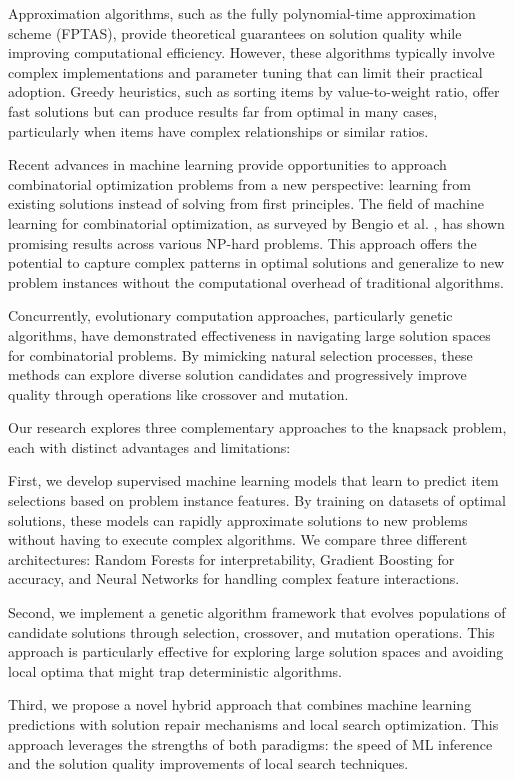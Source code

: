 \documentclass[conference, a4paper]{IEEEtran}
\begin{document}
Approximation algorithms, such as the fully polynomial-time approximation scheme (FPTAS), provide theoretical guarantees on solution quality while improving computational efficiency. However, these algorithms typically involve complex implementations and parameter tuning that can limit their practical adoption. Greedy heuristics, such as sorting items by value-to-weight ratio, offer fast solutions but can produce results far from optimal in many cases, particularly when items have complex relationships or similar ratios.

Recent advances in machine learning provide opportunities to approach combinatorial optimization problems from a new perspective: learning from existing solutions instead of solving from first principles. The field of machine learning for combinatorial optimization, as surveyed by Bengio et al. \cite{bengio2021machine}, has shown promising results across various NP-hard problems. This approach offers the potential to capture complex patterns in optimal solutions and generalize to new problem instances without the computational overhead of traditional algorithms.

Concurrently, evolutionary computation approaches, particularly genetic algorithms, have demonstrated effectiveness in navigating large solution spaces for combinatorial problems. By mimicking natural selection processes, these methods can explore diverse solution candidates and progressively improve quality through operations like crossover and mutation.

Our research explores three complementary approaches to the knapsack problem, each with distinct advantages and limitations:

First, we develop supervised machine learning models that learn to predict item selections based on problem instance features. By training on datasets of optimal solutions, these models can rapidly approximate solutions to new problems without having to execute complex algorithms. We compare three different architectures: Random Forests for interpretability, Gradient Boosting for accuracy, and Neural Networks for handling complex feature interactions.

Second, we implement a genetic algorithm framework that evolves populations of candidate solutions through selection, crossover, and mutation operations. This approach is particularly effective for exploring large solution spaces and avoiding local optima that might trap deterministic algorithms.

Third, we propose a novel hybrid approach that combines machine learning predictions with solution repair mechanisms and local search optimization. This approach leverages the strengths of both paradigms: the speed of ML inference and the solution quality improvements of local search techniques.
\end{document}
